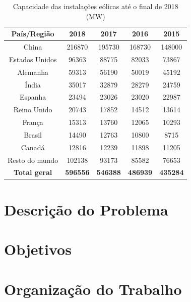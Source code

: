 \begin{table}[h]
	\centering
	\caption{Capacidade das instalações eólicas até o final de 2018 (MW)}
	\label{tab:capacidade-instalada}
	
	\begin{tabular}{ccccc}
		\toprule
		\textbf{País/Região} & \textbf{2018} & \textbf{2017} & \textbf{2016} & \textbf{2015}\\
		\midrule
		China & 216870 & 195730 & 168730 & 148000 \\
		Estados Unidos & 96363 & 88775 & 82033 & 73867 \\
		Alemanha & 59313 & 56190 & 50019 & 45192 \\
		Índia & 35017 & 32879 & 28279 & 24759 \\
		Espanha & 23494 & 23026 & 23020 & 22987 \\
		Reino Unido & 20743 & 17852 & 14512 & 13614 \\
		França & 15313 & 13760 & 12065 & 10293 \\
        Brasil & 14490 & 12763 & 10800 & 8715 \\
        Canadá & 12816 & 12239 & 11898 & 11205 \\
        Resto do mundo & 102138 & 93173 & 85582 & 76653 \\
        \textbf{Total geral} & \textbf{596556} & \textbf{546388} & \textbf{486939} & \textbf{435284} \\
		\bottomrule
	\end{tabular}
\end{table}




\section{Descrição do Problema}


\section{Objetivos}

\section{Organização do Trabalho}


